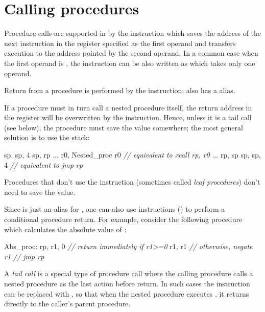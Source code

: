 \documentclass[a4paper,12pt,twoside,extrafontsizes]{memoir}
\begin{document}
\section{Calling procedures}
\label{sec:callingprocedures}

Procedure calls are supported in \lxp{} by the  instruction which saves the address of the next instruction in the register specified as the first operand and transfers execution to the address pointed by the second operand. In a common case when the first operand is , the instruction can be also written as  which takes only one operand.

Return from a procedure is performed by the  instruction;  also has a  alias.

If a procedure must in turn call a nested procedure itself, the return address in the  register will be overwritten by the  instruction. Hence, unless it is a tail call (see below), the procedure must save the  value somewhere; the most general solution is to use the stack:

\begin{codepar}
     sp, sp, 4
     sp, rp
    ...
     r0, Nested_proc
     r0 \emph{// equivalent to xcall rp, r0}
    ...
     rp, sp
     sp, sp, 4
     \emph{// equivalent to jmp rp}
\end{codepar}

Procedures that don't use the  instruction (sometimes called \emph{leaf procedures}) don't need to save the  value.

Since  is just an alias for , one can also use  instructions () to perform a conditional procedure return. For example, consider the following procedure which calculates the absolute value of :

\begin{codepar}
Abs_proc:
     rp, r1, 0 \emph{// return immediately if r1>=0}
     r1, r1 \emph{// otherwise, negate r1}
     \emph{// jmp rp}
\end{codepar}

A \emph{tail call} is a special type of procedure call where the calling procedure calls a nested procedure as the last action before return. In such cases the  instruction can be replaced with , so that when the nested procedure executes , it returns directly to the caller's parent procedure.
\end{document}
